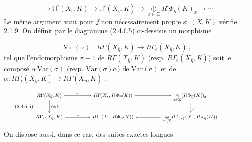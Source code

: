 \begin{equation}\tag{2.4.6.3}
\longrightarrow \mathbb{H}^i(X_s, K) \longrightarrow \mathbb{H}^i(X_{\overline{\eta}}, K) \longrightarrow \underset{x \in \Sigma}{\oplus} R^i\Phi_{\overline{\eta}}(K)_x \longrightarrow \cdots
\end{equation}
Le même argument vaut pour $f$ non nécessairement propre si $(X, K)$ vérifie 2.1.9. On définit par le diagramme (2.4.6.5) ci-dessous un morphisme

\begin{equation}\tag{2.4.6.4}
\mathrm{Var}(\sigma) \ : \ R\Gamma(X_{\overline{\eta}}, K) \longrightarrow R\Gamma_c(X_{\overline{\eta}}, K) \ ,
\end{equation}
tel que l'endomorphisme $\sigma-1$ de $R\Gamma(X_{\overline{\eta}}, K)$ (resp. $R\Gamma_c(X_{\overline{\eta}}, K)$) soit le composé $\alpha \, \mathrm{Var}(\sigma)$ (resp. $\mathrm{Var}(\sigma)\alpha$) de $\mathrm{Var}(\sigma)$ et de $\alpha : R\Gamma_c(X_{\overline{\eta}}, K) \longrightarrow R\Gamma(X_{\overline{\eta}}, K)$ .

\begin{equation}\tag{2.4.6.5}
\begin{tikzcd}[column sep=huge]
R\Gamma (X_{\overline{\eta}} , K) \arrow[r, "\sim"] \arrow[d, "\mathrm{Var}(\sigma)"] & R\Gamma(X_s, R\Psi_{\overline{\eta}}(K)) \arrow[r] & \underset{x \in \Sigma}{\oplus} (R\Phi_{\overline{\eta}}(K))_x \arrow[d, "\oplus"] & \\
R\Gamma_c(X_{\overline{\eta}}, K) \arrow[r, "\sim"] & R\Gamma_c(X_s, R\Psi_{\overline{\eta}}(K)) & \underset{x \in \Sigma}{\oplus} R\Gamma_{\{x\}}(X_s,R\Psi_{\overline{\eta}}(K)) \arrow[l] & .
\end{tikzcd}
\end{equation}
On dispose aussi, dans ce cas, des suites exactes longues

